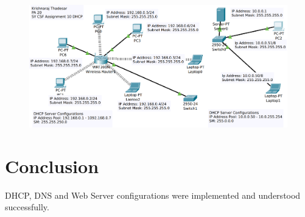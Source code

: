 \documentclass[11pt]{article}
\begin{document}
\begin{figure}[H]
	\centering
	\includegraphics[scale=0.35]{../Screenshots/Assignment_10_screenshot.png}
\end{figure}


\section{Conclusion}
DHCP, DNS and Web Server configurations were implemented and understood successfully. 
\end{document}
